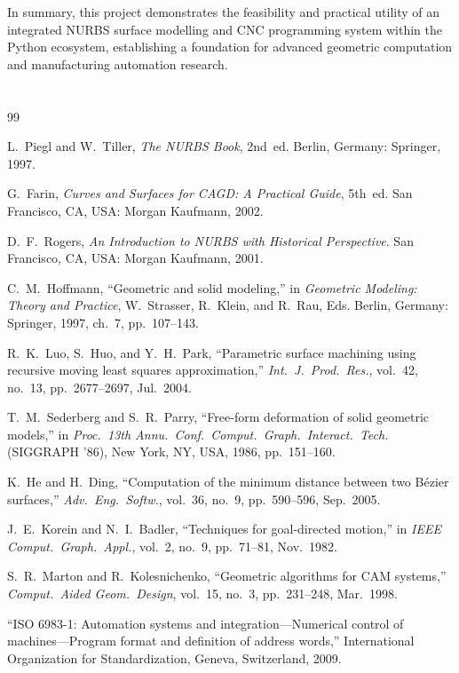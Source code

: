 \documentclass[a4paper,12pt]{article}
\begin{document}
In summary, this project demonstrates the feasibility and practical utility of
an integrated NURBS surface modelling and CNC programming system within the
Python ecosystem, establishing a foundation for advanced geometric computation
and manufacturing automation research.

\section*{}

\begin{thebibliography}{99}

L.~Piegl and W.~Tiller,
\emph{The NURBS Book}, 2nd~ed.
Berlin, Germany: Springer, 1997.

G.~Farin,
\emph{Curves and Surfaces for CAGD: A Practical Guide}, 5th~ed.
San Francisco, CA, USA: Morgan Kaufmann, 2002.

D.~F.~Rogers,
\emph{An Introduction to NURBS with Historical Perspective}.
San Francisco, CA, USA: Morgan Kaufmann, 2001.

C.~M.~Hoffmann,
``Geometric and solid modeling,'' in
\emph{Geometric Modeling: Theory and Practice},
W.~Strasser, R.~Klein, and R.~Rau, Eds.
Berlin, Germany: Springer, 1997, ch.~7, pp.~107--143.

R.~K.~Luo, S.~Huo, and Y.~H.~Park,
``Parametric surface machining using recursive moving least squares
approximation,''
\emph{Int.\ J.\ Prod.\ Res.}, vol.~42, no.~13, pp.~2677--2697, Jul.~2004.

T.~M.~Sederberg and S.~R.~Parry,
``Free-form deformation of solid geometric models,''
in \emph{Proc.\ 13th Annu.\ Conf.\ Comput.\ Graph.\ Interact.\ Tech.}
(SIGGRAPH '86), New York, NY, USA, 1986, pp.~151--160.

K.~He and H.~Ding,
``Computation of the minimum distance between two B\'{e}zier surfaces,''
\emph{Adv.\ Eng.\ Softw.}, vol.~36, no.~9, pp.~590--596, Sep.~2005.

J.~E.~Korein and N.~I.~Badler,
``Techniques for goal-directed motion,'' in
\emph{IEEE Comput.\ Graph.\ Appl.}, vol.~2, no.~9, pp.~71--81, Nov.~1982.

S.~R.~Marton and R.~Kolesnichenko,
``Geometric algorithms for CAM systems,''
\emph{Comput.\ Aided Geom.\ Design}, vol.~15, no.~3, pp.~231--248, Mar.~1998.

``ISO 6983-1: Automation systems and integration—Numerical control of
machines—Program format and definition of address words,'' International
Organization for Standardization, Geneva, Switzerland, 2009.

\end{thebibliography}
\end{document}
